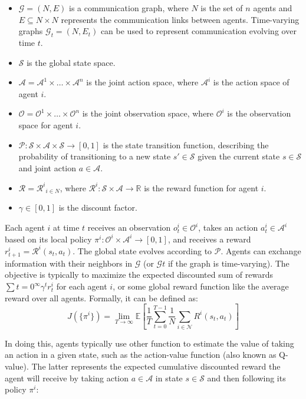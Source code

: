 \documentclass[sigconf]{acmart}
\begin{document}
\begin{itemize}
  \item $\mathcal{G} = (N, E)$ is a communication graph, where $N$ is the set of $n$ agents and $E \subseteq N \times N$ represents the communication links between agents. 
  Time-varying graphs $\mathcal{G}_t = (N, E_t)$ can be used to represent communication evolving over time $t$.
  \item $\mathcal{S}$ is the global state space.
  \item $\mathcal{A} = \mathcal{A}^1 \times \dots \times \mathcal{A}^n$ is the joint action space, where $\mathcal{A}^i$ is the action space of agent $i$.
  \item $\mathcal{O} = \mathcal{O}^1 \times \dots \times \mathcal{O}^n$ is the joint observation space, where $\mathcal{O}^i$ is the observation space for agent $i$.
  \item $\mathcal{P}: \mathcal{S} \times \mathcal{A} \times \mathcal{S} \to [0, 1]$ is the state transition function, describing the probability of transitioning to a new state $s' \in \mathcal{S}$ given the current state $s \in \mathcal{S}$ and joint action $a \in \mathcal{A}$.
  \item $\mathcal{R} = {\mathcal{R}^i}_{i \in N}$, where $\mathcal{R}^i: \mathcal{S} \times \mathcal{A} \to \mathbb{R}$ is the reward function for agent $i$.
  \item $\gamma \in [0, 1]$ is the discount factor.
\end{itemize}
Each agent $i$ at time $t$ receives an observation $o^i_t \in \mathcal{O}^i$, 
takes an action $a^i_t \in \mathcal{A}^i$ based on its local policy $\pi^i: \mathcal{O}^i \times \mathcal{A}^i \to [0,1]$, and receives a reward $r^i_{t+1} = \mathcal{R}^i(s_t, a_t)$. 
%
The global state evolves according to $\mathcal{P}$. 
Agents can exchange information with their neighbors in $\mathcal{G}$ 
(or $\mathcal{G}t$ if the graph is time-varying). 
%
The objective is typically to maximize the expected discounted sum of rewards $\sum{t=0}^{\infty} \gamma^t r^i_t$ for each agent $i$, 
or some global reward function like the average reward over all agents.
Formally, it can be defined as:
\[ J(\{\pi^i\}) = \lim_{T \to \infty} \mathbb{E} \left[ \frac{1}{T} \sum_{t=0}^{T-1} \frac{1}{N} \sum_{i \in \mathcal{N}} R^i(s_t, a_t) \right] \]

In doing this, agents typically use other function to estimate the value of taking an action in a given state, such as the action-value function (also known as Q-value). 
The latter represents the expected cumulative discounted reward the agent will receive by taking action $a \in \mathcal{A}$ in state $s \in \mathcal{S}$ and then following its policy $\pi^i$:
\end{document}
